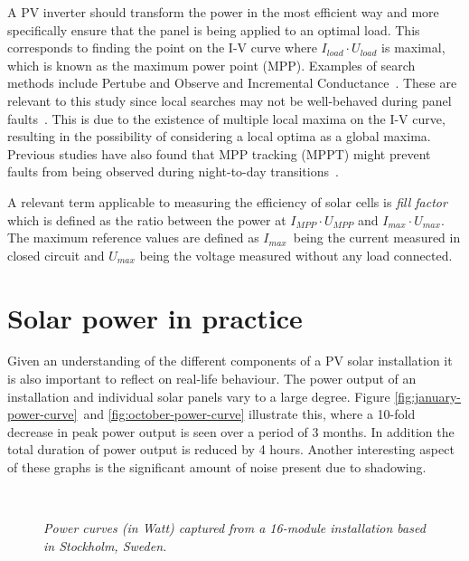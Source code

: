 A PV inverter should transform the power in the most efficient way and more specifically ensure that the panel is being applied to an optimal load.
This corresponds to finding the point on the I-V curve where $I_{load} \cdot U_{load}$ is maximal, which is known as the maximum power point (MPP).
Examples of search methods include Pertube and Observe and Incremental Conductance~\cite{Roman2006}.
These are relevant to this study since local searches may not be well-behaved during panel faults~\cite{Roman2006}.
This is due to the existence of multiple local maxima on the I-V curve, resulting in the possibility of considering a local optima as a global maxima.
Previous studies have also found that MPP tracking (MPPT) might prevent faults from being observed during night-to-day transitions~\cite{Zhao2010night}.

A relevant term applicable to measuring the efficiency of solar cells is \emph{fill factor} which is defined as the ratio between the power at $I_{MPP} \cdot U_{MPP}$ and $I_{max} \cdot U_{max}$.
The maximum reference values are defined as $I_{max}$ being the current measured in closed circuit and $U_{max}$ being the voltage measured without any load connected.


\section{Solar power in practice}
Given an understanding of the different components of a PV solar installation it is also important to reflect on real-life behaviour.
The power output of an installation and individual solar panels vary to a large degree.
Figure \ref{fig:january-power-curve} and \ref{fig:october-power-curve} illustrate this, where a 10-fold decrease in peak power output is seen over a period of 3 months.
In addition the total duration of power output is reduced by 4 hours.
Another interesting aspect of these graphs is the significant amount of noise present due to shadowing.

\begin{figure}[here]
\centering
{}
~
\caption[Power curves captured from an installation]{\emph{Power curves (in Watt) captured from a 16-module installation based in Stockholm, Sweden.}}
\end{figure}

